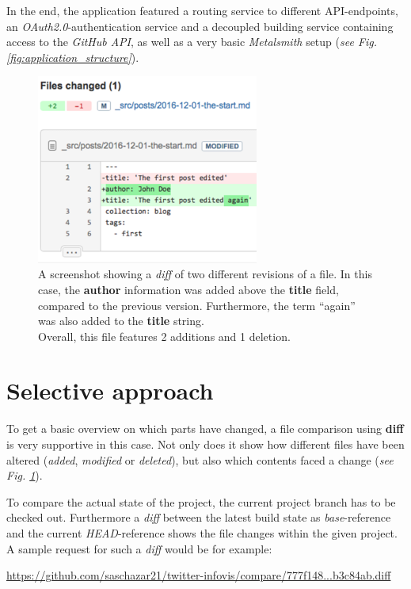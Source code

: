 \documentclass[a4paper,english,11pt]{report}
\begin{document}
In the end, the application featured a routing service to different API-endpoints, an \emph{OAuth2.0}-authentication service and a decoupled building service containing access to the \emph{GitHub API}, as well as a very basic \emph{Metalsmith} setup (\emph{see Fig. \ref{fig:application_structure}}).

%
\begin{figure}[p]
    \centering
    \includegraphics[width=0.65\textwidth]{diff_sample.png}
    \caption{A screenshot showing a \emph{diff} of two different revisions of a file. In this case, the \textbf{author} information was added above the \textbf{title} field, compared to the previous version. Furthermore, the term ``again'' was also added to the \textbf{title} string.\\ Overall, this file features 2 additions and 1 deletion.}
    \label{fig:diff_sample}
\end{figure}
%
\section{Selective approach}
To get a basic overview on which parts have changed, a file comparison using \textbf{diff} is very supportive in this case. Not only does it show how different files have been altered (\emph{added}, \emph{modified} or \emph{deleted}), but also which contents faced a change (\emph{see Fig. \ref{fig:diff_sample}}).

To compare the actual state of the project, the current project branch has to be checked out. Furthermore a \emph{diff} between the latest build state as \emph{base}-reference and the current \emph{HEAD}-reference shows the file changes within the given project. A sample request for such a \emph{diff} would be for example:
\begin{center}
\url{https://github.com/saschazar21/twitter-infovis/compare/777f148...b3c84ab.diff}
\end{center}
\end{document}
